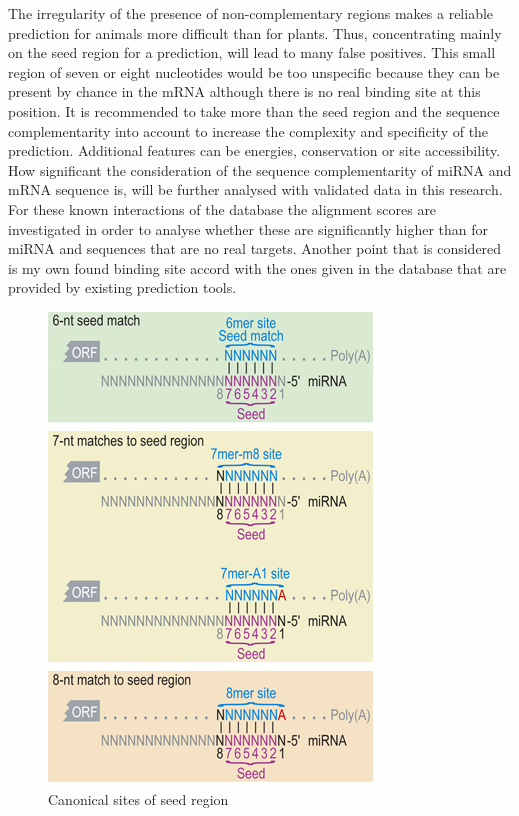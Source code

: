 \documentclass[11pt, a4paper, oneside]{book}
\begin{document}
The irregularity of the presence of non-complementary regions makes a reliable prediction for animals more difficult than for plants. Thus, concentrating mainly on the seed region for a prediction, will lead to many false positives. This small region of seven or eight nucleotides would be too unspecific because they can be present by chance in the mRNA although there is no real binding site at this position. It is recommended to take more than the seed region and the sequence complementarity into account to increase the complexity and specificity of the prediction. Additional features can be energies, conservation or site accessibility. How significant the consideration of the sequence complementarity of miRNA and mRNA sequence is, will be further analysed with validated data in this research. For these known interactions of the database the alignment scores are investigated in order to analyse whether these are significantly higher than for miRNA and sequences that are no real targets. Another point that is considered is my own found binding site accord with the ones given in the database that are provided by existing prediction tools. \\


\begin{figure}
\centering
\includegraphics[scale=0.6]{results/canonical_sites.png}
\caption{Canonical sites of seed region}
\label{Fig:canonical}
\end{figure}
\end{document}
